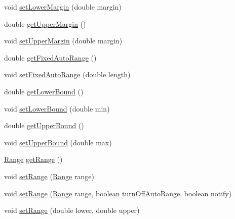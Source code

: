 \begin{DoxyCompactItemize}
\item 
void \mbox{\hyperlink{classorg_1_1jfree_1_1chart_1_1axis_1_1_value_axis_a74bac229eb07e3502a9ca3934563a636}{set\+Lower\+Margin}} (double margin)
\item 
double \mbox{\hyperlink{classorg_1_1jfree_1_1chart_1_1axis_1_1_value_axis_a643d075d5cce4ad54ce8274b8b2d38a8}{get\+Upper\+Margin}} ()
\item 
void \mbox{\hyperlink{classorg_1_1jfree_1_1chart_1_1axis_1_1_value_axis_a6ba839a843d27cf2f79a10a20dd98650}{set\+Upper\+Margin}} (double margin)
\item 
double \mbox{\hyperlink{classorg_1_1jfree_1_1chart_1_1axis_1_1_value_axis_a6b0e72b7c1c1964aff3ac2a854820fb7}{get\+Fixed\+Auto\+Range}} ()
\item 
void \mbox{\hyperlink{classorg_1_1jfree_1_1chart_1_1axis_1_1_value_axis_a35c73feedf55ee5dba21cd4aba5014d8}{set\+Fixed\+Auto\+Range}} (double length)
\item 
double \mbox{\hyperlink{classorg_1_1jfree_1_1chart_1_1axis_1_1_value_axis_afaef2ebef47d76549601084111009521}{get\+Lower\+Bound}} ()
\item 
void \mbox{\hyperlink{classorg_1_1jfree_1_1chart_1_1axis_1_1_value_axis_a0d48d13633027f697aa6f909bc39444c}{set\+Lower\+Bound}} (double min)
\item 
double \mbox{\hyperlink{classorg_1_1jfree_1_1chart_1_1axis_1_1_value_axis_a392f4637b486698032128b77a85cbf3e}{get\+Upper\+Bound}} ()
\item 
void \mbox{\hyperlink{classorg_1_1jfree_1_1chart_1_1axis_1_1_value_axis_ab2872c6051cab2e55611cd85ef3baabb}{set\+Upper\+Bound}} (double max)
\item 
\mbox{\hyperlink{classorg_1_1jfree_1_1data_1_1_range}{Range}} \mbox{\hyperlink{classorg_1_1jfree_1_1chart_1_1axis_1_1_value_axis_af52527fb8e81b79bdf0042eda7c7f138}{get\+Range}} ()
\item 
void \mbox{\hyperlink{classorg_1_1jfree_1_1chart_1_1axis_1_1_value_axis_a917f68b11632931a40e57551164c181e}{set\+Range}} (\mbox{\hyperlink{classorg_1_1jfree_1_1data_1_1_range}{Range}} range)
\item 
void \mbox{\hyperlink{classorg_1_1jfree_1_1chart_1_1axis_1_1_value_axis_a540be4250c0b6fb23b56abed51328abf}{set\+Range}} (\mbox{\hyperlink{classorg_1_1jfree_1_1data_1_1_range}{Range}} range, boolean turn\+Off\+Auto\+Range, boolean notify)
\item 
void \mbox{\hyperlink{classorg_1_1jfree_1_1chart_1_1axis_1_1_value_axis_abd4f5011d096363c9af57d181203e048}{set\+Range}} (double lower, double upper)

\end{DoxyCompactItemize}
